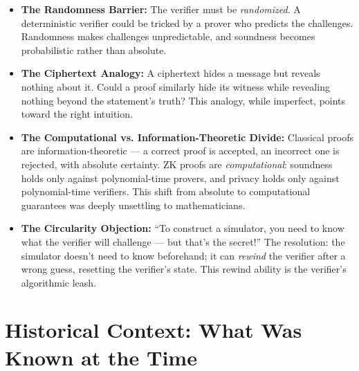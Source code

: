 \begin{itemize}
\item \textbf{The Randomness Barrier:} The verifier must be \emph{randomized}. A deterministic verifier could be tricked by a prover who predicts the challenges. Randomness makes challenges unpredictable, and soundness becomes probabilistic rather than absolute.
\item \textbf{The Ciphertext Analogy:} A ciphertext hides a message but reveals nothing about it. Could a proof similarly hide its witness while revealing nothing beyond the statement's truth? This analogy, while imperfect, points toward the right intuition.
\item \textbf{The Computational vs. Information-Theoretic Divide:} Classical proofs are information-theoretic --- a correct proof is accepted, an incorrect one is rejected, with absolute certainty. ZK proofs are \emph{computational}: soundness holds only against polynomial-time provers, and privacy holds only against polynomial-time verifiers. This shift from absolute to computational guarantees was deeply unsettling to mathematicians.
\item \textbf{The Circularity Objection:} ``To construct a simulator, you need to know what the verifier will challenge --- but that's the secret!'' The resolution: the simulator doesn't need to know beforehand; it can \emph{rewind} the verifier after a wrong guess, resetting the verifier's state. This rewind ability is the verifier's algorithmic leash.
\end{itemize}

\section{Historical Context: What Was Known at the Time}
\label{sec:zk:context}

